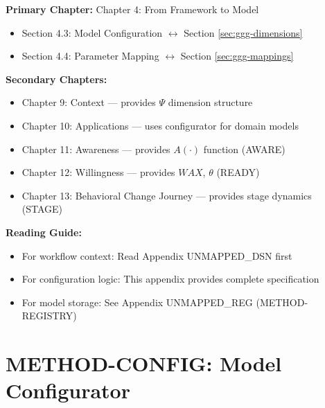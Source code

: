 \begin{tcolorbox}[colback=purple!5!white, colframe=purple!75!black,
    title=Chapter Linkage]

\textbf{Primary Chapter:} Chapter 4: From Framework to Model
\begin{itemize}[nosep]
\item Section 4.3: Model Configuration $\leftrightarrow$ Section \ref{sec:ggg-dimensions}
\item Section 4.4: Parameter Mapping $\leftrightarrow$ Section \ref{sec:ggg-mappings}
\end{itemize}

\textbf{Secondary Chapters:}
\begin{itemize}[nosep]
\item Chapter 9: Context --- provides $\Psi$ dimension structure
\item Chapter 10: Applications --- uses configurator for domain models
\item Chapter 11: Awareness --- provides $A(\cdot)$ function (AWARE)
\item Chapter 12: Willingness --- provides $WAX$, $\theta$ (READY)
\item Chapter 13: Behavioral Change Journey --- provides stage dynamics (STAGE)
\end{itemize}

\textbf{Reading Guide:}
\begin{itemize}[nosep]
\item For workflow context: Read Appendix UNMAPPED_DSN first
\item For configuration logic: This appendix provides complete specification
\item For model storage: See Appendix UNMAPPED_REG (METHOD-REGISTRY)
\end{itemize}

\end{tcolorbox}

\chapter{METHOD-CONFIG: Model Configurator}
\label{app:method-config}

\begin{abstract}
This appendix defines the Model Configurator---a systematic tool for generating
\textbf{10C-complete} behavioral models from four configuration dimensions: Level ($L$),
Geography ($\Psi_{geo}$), Domain, and Scope Type. The Configurator uses seven mapping
tables to auto-populate all 10C parameters: context ($\Psi$), utility dimensions ($C$),
complementarity ($\gamma$), functional form, awareness ($A$), willingness ($WAX$, $\theta$),
and stage dynamics ($\tau$, $\rho$, $\kappa$). This transforms model design from
an expert-dependent art into a structured, reproducible process with complete 10C coverage.
\end{abstract}



